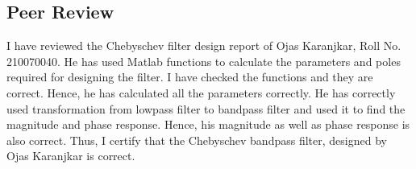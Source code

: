 \documentclass[12pt]{article}
\begin{document}
\subsection{Peer Review}

I have reviewed the Chebyschev filter design report of Ojas Karanjkar, Roll No. 210070040. He has used Matlab functions to calculate the parameters and poles required for designing the filter. I have checked the functions and they are correct. Hence, he has calculated all the parameters correctly. He has correctly used transformation from lowpass filter to bandpass filter and used it to find the magnitude and phase response. Hence, his magnitude as well as phase response is also correct.
Thus, I certify that the Chebyschev bandpass filter, designed by Ojas Karanjkar is correct.
\end{document}
